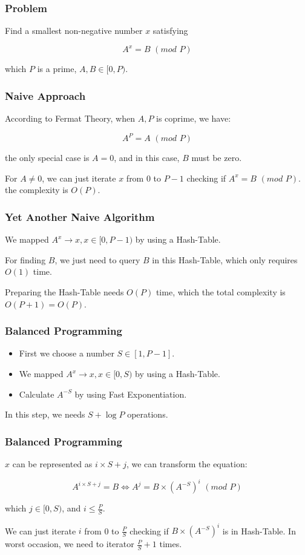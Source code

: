 \begin{frame}
\frametitle{Problem}
Find a smallest non-negative number $x$ satisfying

\[A^x = B\,\,(mod\,\,P)\]

which $P$ is a prime, $A, B \in [0, P)$.
\end{frame}
\begin{frame}
\frametitle{Naive Approach}
According to Fermat Theory, when $A, P$ is coprime, we have: 

\[A^{P} = A\,\,(mod\,\,P)\]

the only special case is $A = 0$, and in this case, $B$ must be zero.

\bigskip
For $A \neq 0$, we can just iterate $x$ from 0 to $P - 1$ checking if $A^x = B\,\,(mod\,\,P)$.
the complexity is $O(P)$.


\end{frame}
\begin{frame}
\frametitle{Yet Another Naive Algorithm}
We mapped $A^{x} \rightarrow x, x \in [0, P - 1)$ by using a Hash-Table.

\bigskip
For finding $B$, we just need to query $B$ in this Hash-Table, which only requires $O(1)$ time.

\bigskip
Preparing the Hash-Table needs $O(P)$ time, which the total complexity is $O(P + 1) = O(P)$.
\end{frame}

\begin{frame}
\frametitle{Balanced Programming}
\begin{itemize}
\item First we choose a number $S \in [1, P - 1]$.
\item We mapped $A^{x} \rightarrow x, x \in [0, S)$ by using a Hash-Table.
\item Calculate $A^{-S}$ by using Fast Exponentiation.
\end{itemize}

\bigskip
In this step, we needs $S + \log P$ operations.
\end{frame}

\begin{frame}
\frametitle{Balanced Programming}
$x$ can be represented as $i\times S + j$, we can transform the equation:

\[A^{i\times S + j} = B \Leftrightarrow A^{j} = B \times (A^{-S})^{i}\,\,(mod\,\,P)\]

which $j \in [0, S)$, and $i \leq \frac{P}{S}$.

\bigskip
We can just iterate $i$ from 0 to $\frac{P}{S}$ checking if $B \times (A^{-S})^{i}$ is in Hash-Table. In worst occasion, we need to iterator $\frac{P}{S} + 1$ times.
\end{frame}

